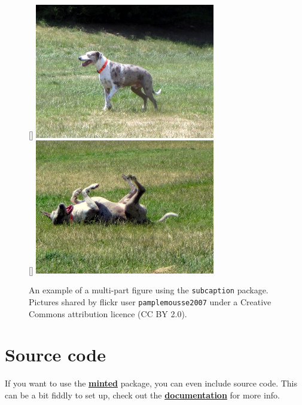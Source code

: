 \documentclass[12pt,xetex]{scrbook}
\begin{document}
\begin{onehalfspace}
\begin{figure}
  \centering
  [\textwidth]%
  {\includegraphics[width=0.7\textwidth]{dog-1}}\\
  \vspace{1cm}
  [\textwidth]%
  {\includegraphics[width=0.7\textwidth]{dog-2}}%
  \caption{An example of a multi-part figure using the
    \texttt{subcaption} package. Pictures shared by flickr user
    \texttt{pamplemousse2007} under a Creative Commons attribution
    licence (CC BY 2.0).}
  \label{fig:dog-figure}
\end{figure}

\section{Source code}
\label{sec:source-code}

If you want to use the
\href{https://github.com/gpoore/minted}{\textbf{minted}} package, you
can even include source code. This can be a bit fiddly to set up,
check out the
\href{https://github.com/gpoore/minted/blob/master/source/minted.pdf}{\textbf{documentation}}
for more info.


\end{onehalfspace}
\end{document}
